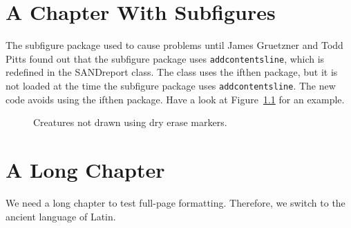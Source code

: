 \documentclass[pdf,ps2pdf,12pt,report,OUO]{SANDreport}
\begin{document}
    \chapter{A Chapter With Subfigures}
	The subfigure package used to cause problems until James
	Gruetzner and Todd Pitts found out that the subfigure
	package uses {\tt addcontentsline}, which is redefined in
	the SANDreport class. The class uses the ifthen package,
	but it is not loaded at the time the subfigure package
	uses {\tt addcontentsline}.  The new code avoids using the
	ifthen package.  Have a look at Figure~\ref{fig:creatures}
	for an example.

	\begin{figure}[ht]
	    \centering
	    \caption{Creatures not drawn using dry erase markers.}
	    \label{fig:creatures}
	\end{figure}



    \chapter{A Long Chapter}\label{sec:long}
	We need a long chapter to test full-page formatting. Therefore,
	we switch to the ancient language of Latin.
\end{document}
